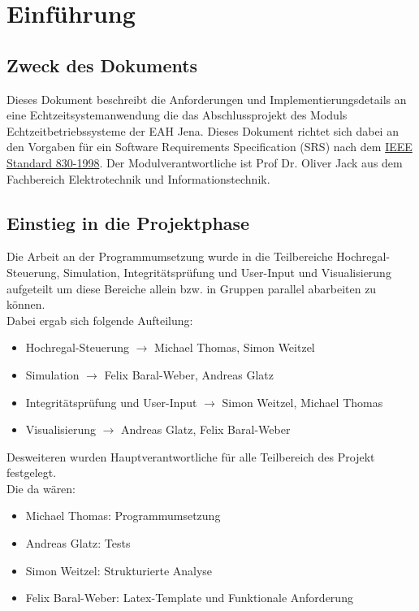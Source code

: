 \section{Einführung}
\subsection{Zweck des Dokuments}
Dieses Dokument beschreibt die Anforderungen und Implementierungsdetails an eine Echtzeitsystemanwendung die das Abschlussprojekt des Moduls Echtzeitbetriebssysteme der EAH Jena. Dieses Dokument richtet sich dabei an den Vorgaben für ein Software Requirements Specification (SRS) nach dem \href{https://de.wikipedia.org/wiki/Software_Requirements_Specification}{IEEE Standard 830-1998}. Der Modulverantwortliche ist Prof Dr. Oliver Jack aus dem Fachbereich Elektrotechnik und Informationstechnik.\\

\subsection{Einstieg in die Projektphase}
Die Arbeit an der Programmumsetzung wurde in die Teilbereiche Hochregal-Steuerung, Simulation, Integritätsprüfung und User-Input und Visualisierung aufgeteilt um diese Bereiche allein bzw. in Gruppen parallel  abarbeiten zu können.\\
Dabei ergab sich folgende Aufteilung:
\begin{itemize} 
	\item Hochregal-Steuerung $\rightarrow$ Michael Thomas, Simon Weitzel
	\item Simulation $\rightarrow$ Felix Baral-Weber, Andreas Glatz
	\item Integritätsprüfung und User-Input $\rightarrow$ Simon Weitzel, Michael Thomas
	\item Visualisierung $\rightarrow$ Andreas Glatz, Felix Baral-Weber
\end{itemize}

Desweiteren wurden Hauptverantwortliche für alle Teilbereich des Projekt festgelegt.\\

Die da wären:\\
\begin{itemize} 
	\item Michael Thomas: Programmumsetzung
	\item Andreas Glatz: Tests
	\item Simon Weitzel: Strukturierte Analyse
	\item Felix Baral-Weber: Latex-Template und Funktionale Anforderung
\end{itemize}
